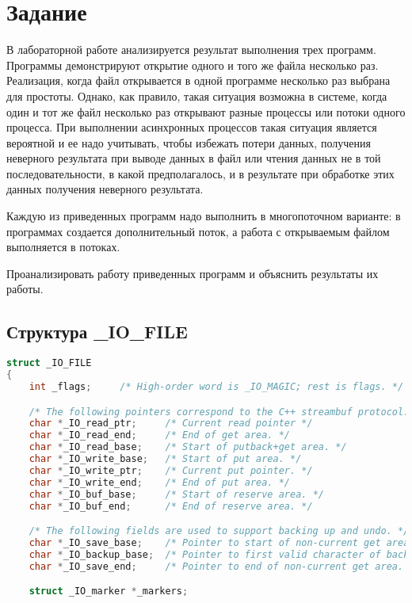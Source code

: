 \chapter{Задание}

В лабораторной работе анализируется результат выполнения трех программ. Программы демонстрируют открытие одного и того же файла несколько раз. Реализация, когда файл открывается в одной программе несколько раз выбрана для простоты. Однако, как правило, такая ситуация возможна в системе, когда один и тот же файл несколько раз открывают разные процессы или потоки одного процесса. При выполнении асинхронных процессов такая ситуация является вероятной и ее надо учитывать, чтобы избежать потери данных, получения неверного результата при выводе данных в файл или чтения данных не в той последовательности, в какой предполагалось, и в результате при обработке этих данных получения неверного результата.

Каждую из приведенных программ надо выполнить в многопоточном варианте: в программах создается дополнительный поток, а работа с открываемым файлом выполняется в потоках.

Проанализировать работу приведенных программ и объяснить результаты их работы.

\section*{Структура \_IO\_FILE}

\begin{lstlisting}[language=C]
struct _IO_FILE
{
    int _flags;		/* High-order word is _IO_MAGIC; rest is flags. */

    /* The following pointers correspond to the C++ streambuf protocol. */
    char *_IO_read_ptr;	    /* Current read pointer */
    char *_IO_read_end;	    /* End of get area. */
    char *_IO_read_base;	/* Start of putback+get area. */
    char *_IO_write_base;	/* Start of put area. */
    char *_IO_write_ptr;	/* Current put pointer. */
    char *_IO_write_end;	/* End of put area. */
    char *_IO_buf_base;	    /* Start of reserve area. */
    char *_IO_buf_end;	    /* End of reserve area. */

    /* The following fields are used to support backing up and undo. */
    char *_IO_save_base;    /* Pointer to start of non-current get area. */
    char *_IO_backup_base;  /* Pointer to first valid character of backup area */
    char *_IO_save_end;     /* Pointer to end of non-current get area. */

    struct _IO_marker *_markers;
\end{lstlisting}

